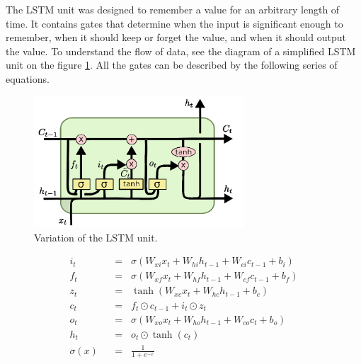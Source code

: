 The LSTM unit was designed to remember a value for an arbitrary length of time. It contains gates that determine when the input is significant enough to remember, when it should keep or forget the value, and when it should output the value. To understand the flow of data, see the diagram of a simplified LSTM unit on the figure \ref{fig:lstm}. All the gates can be described by the following series of equations.

\begin{figure}[!ht]
	\centering
	\includegraphics[width=0.7\textwidth]{./fig/LSTM3-var-peepholes.png}
	\caption{Variation of the LSTM unit. \cite{colah-lstm}
		\label{fig:lstm}}
\end{figure}

\belowdisplayskip=24pt
\begin{align}
	i_t \hspace{7pt}&=\hspace{7pt} \sigma(W_{xi}x_t + W_{hi}h_{t-1} + W_{ci}c_{t-1} + b_i) \label{eq:lstm1}\\
	f_t \hspace{7pt}&=\hspace{7pt} \sigma(W_{xf}x_t + W_{hf}h_{t-1} + W_{cf}c_{t-1} + b_f) \label{eq:lstm2}\\
	z_t \hspace{7pt}&=\hspace{7pt} \tanh(W_{xc}x_t + W_{hc}h_{t-1} + b_c) \label{eq:lstm3}\\
	c_t \hspace{7pt}&=\hspace{7pt} f_t\odot c_{t-1} + i_t\odot z_t \label{eq:lstm4}\\
	o_t \hspace{7pt}&=\hspace{7pt} \sigma(W_{xo}x_t + W_{ho}h_{t-1} + W_{co}c_t + b_o) \label{eq:lstm5}\\
	h_t \hspace{7pt}&=\hspace{7pt} o_t\odot \tanh(c_t) \label{eq:lstm6}\\[16pt]
	\sigma(x) \hspace{7pt}&=\hspace{7pt} \frac{1}{1+e^{-x}} \label{eq:lstm7}
\end{align}


